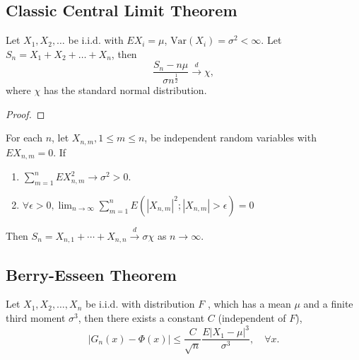 \subsection{Classic Central Limit Theorem}

\begin{theorem}
    Let $X_1,X_2,\ldots$ be i.i.d. with $EX_i=\mu$, $\text{Var}(X_i)=\sigma^2<\infty$. Let $S_n=X_1+X_2+\ldots+X_n$, then
    \begin{equation}
        \frac{S_n-n\mu}{\sigma n^{\frac{1}{2}}} \stackrel{d}{\rightarrow} \chi,
    \end{equation}
    where $\chi$ has the standard normal distribution.
\end{theorem}

\begin{proof}

\end{proof}

\begin{theorem}
    For each $n$, let $X_{n,m},1\leq m\leq n$, be independent random variables with $EX_{n,m}=0$. If
    \begin{enumerate}
        \item $\sum_{m=1}^{n}EX_{n,m}^{2} \rightarrow \sigma^{2}>0$.
        \item $\forall\epsilon>0,\lim_{n\rightarrow\infty}\sum_{m=1}^{n}E\left(\left|X_{n,m}\right|^{2};\left|X_{n,m}\right|>\epsilon\right)=0$
    \end{enumerate}
    Then $S_{n}=X_{n,1}+\cdots+X_{n,n}\stackrel{d}{\rightarrow}\sigma\chi$ as $n\rightarrow\infty$.
\end{theorem}

\subsection{Berry-Esseen Theorem}

\begin{theorem}
    Let $X_{1},X_{2},\ldots,X_{n}$ be i.i.d. with distribution $F$ , which has a mean $\mu$ and a finite third moment $\sigma^{3}$, then there exists a constant $C$ (independent of $F$),
    \begin{equation}
        \left|G_{n}(x)-\Phi(x)\right|\leq\frac{C}{\sqrt{n}}\frac{E\left|X_{1}-\mu\right|^{3}}{\sigma^{3}},\quad\forall x.
    \end{equation}
\end{theorem}

